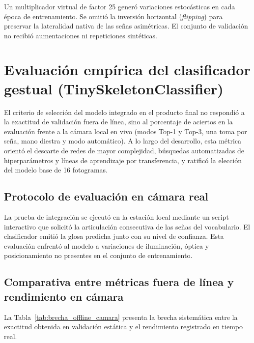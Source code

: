 Un multiplicador virtual de factor 25 generó variaciones estocásticas en cada época de entrenamiento. Se omitió la inversión horizontal (\textit{flipping}) para preservar la lateralidad nativa de las señas asimétricas. El conjunto de validación no recibió aumentaciones ni repeticiones sintéticas.

\section{Evaluación empírica del clasificador gestual (TinySkeletonClassifier)}

El criterio de selección del modelo integrado en el producto final no respondió a la exactitud de validación fuera de línea, sino al porcentaje de aciertos en la evaluación frente a la cámara local en vivo (modos Top-1 y Top-3, una toma por seña, mano diestra y modo automático). A lo largo del desarrollo, esta métrica orientó el descarte de redes de mayor complejidad, búsquedas automatizadas de hiperparámetros y líneas de aprendizaje por transferencia, y ratificó la elección del modelo base de 16 fotogramas.

\subsection{Protocolo de evaluación en cámara real}
\label{sec:protocolo_camara}
La prueba de integración se ejecutó en la estación local mediante un script interactivo que solicitó la articulación consecutiva de las señas del vocabulario. El clasificador emitió la glosa predicha junto con su nivel de confianza. Esta evaluación enfrentó al modelo a variaciones de iluminación, óptica y posicionamiento no presentes en el conjunto de entrenamiento.

\subsection{Comparativa entre métricas fuera de línea y rendimiento en cámara}
La Tabla~\ref{tab:brecha_offline_camara} presenta la brecha sistemática entre la exactitud obtenida en validación estática y el rendimiento registrado en tiempo real.

